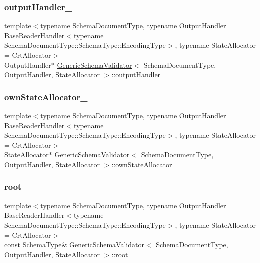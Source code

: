 \subsubsection{\texorpdfstring{output\+Handler\+\_\+}{outputHandler\_}}
{\footnotesize\ttfamily template$<$typename Schema\+Document\+Type, typename Output\+Handler = Base\+Reader\+Handler$<$typename Schema\+Document\+Type\+::\+Schema\+Type\+::\+Encoding\+Type$>$, typename State\+Allocator = Crt\+Allocator$>$ \\
Output\+Handler$\ast$ \hyperlink{classGenericSchemaValidator}{Generic\+Schema\+Validator}$<$ Schema\+Document\+Type, Output\+Handler, State\+Allocator $>$\+::output\+Handler\+\_\+\hspace{0.3cm}{\ttfamily [private]}}

\mbox{\label{classGenericSchemaValidator_a1f8233bfa10ae88aac6137a0e979174b}} 
\subsubsection{\texorpdfstring{own\+State\+Allocator\+\_\+}{ownStateAllocator\_}}
{\footnotesize\ttfamily template$<$typename Schema\+Document\+Type, typename Output\+Handler = Base\+Reader\+Handler$<$typename Schema\+Document\+Type\+::\+Schema\+Type\+::\+Encoding\+Type$>$, typename State\+Allocator = Crt\+Allocator$>$ \\
State\+Allocator$\ast$ \hyperlink{classGenericSchemaValidator}{Generic\+Schema\+Validator}$<$ Schema\+Document\+Type, Output\+Handler, State\+Allocator $>$\+::own\+State\+Allocator\+\_\+\hspace{0.3cm}{\ttfamily [private]}}

\mbox{\label{classGenericSchemaValidator_a7517bd5334a8fc4696fe298dbab2ce31}} 
\subsubsection{\texorpdfstring{root\+\_\+}{root\_}}
{\footnotesize\ttfamily template$<$typename Schema\+Document\+Type, typename Output\+Handler = Base\+Reader\+Handler$<$typename Schema\+Document\+Type\+::\+Schema\+Type\+::\+Encoding\+Type$>$, typename State\+Allocator = Crt\+Allocator$>$ \\
const \hyperlink{classGenericSchemaValidator_ac79628f00f6720bbabb70b44f0d076a0}{Schema\+Type}\& \hyperlink{classGenericSchemaValidator}{Generic\+Schema\+Validator}$<$ Schema\+Document\+Type, Output\+Handler, State\+Allocator $>$\+::root\+\_\+\hspace{0.3cm}{\ttfamily [private]}}

